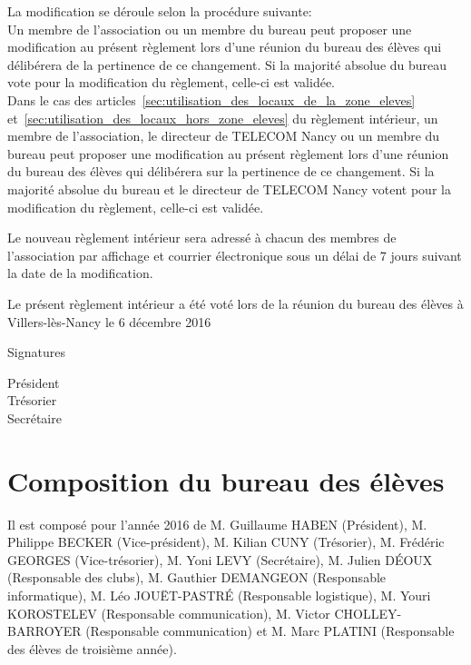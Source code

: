 \documentclass{article} %
\begin{document}
		La modification se déroule selon la procédure suivante:\\
		Un membre de l’association ou un membre du bureau peut proposer une
		modification au présent règlement lors d’une réunion du bureau des
		élèves qui délibérera de la pertinence de ce changement. Si la majorité
		absolue du bureau vote pour la modification du règlement, celle-ci est
		validée.\\
		Dans le cas des
		articles~\ref{sec:utilisation_des_locaux_de_la_zone_eleves}
		et~\ref{sec:utilisation_des_locaux_hors_zone_eleves} du règlement
		intérieur, un membre de l’association, le directeur de TELECOM Nancy ou
		un membre du bureau peut proposer une modification au présent règlement
		lors d’une réunion du bureau des élèves qui délibérera sur la pertinence
		de ce changement. Si la majorité absolue du bureau et le directeur de
		TELECOM Nancy votent pour la modification du règlement, celle-ci est
		validée.

		Le nouveau règlement intérieur sera adressé à chacun des membres de
		l'association par affichage et courrier électronique sous un délai de 7
		jours suivant la date de la modification.

    \vfill
	\begin{center}
		{\large\light{} Le présent règlement intérieur a été voté lors de la réunion
		du bureau des élèves à Villers-lès-Nancy le 6 décembre 2016}
	\end{center}
	\vfill
	Signatures\par
	\begin{multicols}{3}
	    \begin{center}
	        Président \\
	        Trésorier \\
	        Secrétaire
	    \end{center}
	\end{multicols}
	\vspace{3cm}
	\clearpage

	\section*{Composition du bureau des élèves}
		
		Il est composé pour l’année 2016 de M. Guillaume HABEN (Président), M.
		Philippe BECKER (Vice-président), M. Kilian CUNY (Trésorier), M.
		Frédéric GEORGES (Vice-trésorier), M. Yoni LEVY (Secrétaire), M. Julien
		DÉOUX (Responsable des clubs), M. Gauthier DEMANGEON (Responsable
		informatique), M. Léo JOUËT-PASTRÉ (Responsable logistique), M. Youri
		KOROSTELEV (Responsable communication), M. Victor CHOLLEY-BARROYER
		(Responsable communication) et M. Marc PLATINI (Responsable des élèves
		de troisième année).
\end{document}
